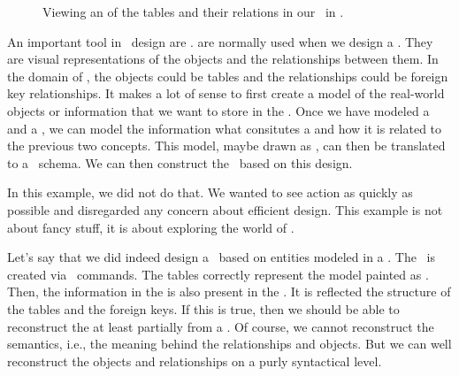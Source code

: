%
%
\FloatBarrier%
%
\begin{figure}%
\centering%
%
%
%
\floatSep%
%
%
%
\floatRowSep%
%
%
%
%
\caption{Viewing an  of the tables and their relations in our \db\ in \libreofficeBase.}%
\label{fig:factoryLibreOfficeBaseERD}%
%
\end{figure}%
%
An important tool in \db\ design are .
 are normally used when we design a \db.
They are visual representations of the objects and the relationships between them.
In the domain of , the objects could be tables and the relationships could be foreign key relationships.
It makes a lot of sense to first create a model of the real-world objects or information that we want to store in the \db.
Once we have modeled a  and a , we can model the information what consitutes a  and how it is related to the previous two concepts.
This model, maybe drawn as , can then be translated to a \db\ schema.
We can then construct the \db\ based on this design.

In this example, we did not do that.
We wanted to see action as quickly as possible and disregarded any concern about efficient design.
This example is not about fancy stuff, it is about exploring the world of .

Let's say that we did indeed design a \db\ based on entities modeled in a .
The \db\ is created via \sql\ commands.
The tables correctly represent the model painted as .
Then, the information in the  is also present in the \db.
It is reflected the structure of the tables and the foreign keys.
If this is true, then we should be able to reconstruct the  at least partially from a \db.
Of course, we cannot reconstruct the semantics, i.e., the meaning behind the relationships and objects.
But we can well reconstruct the objects and relationships on a purly syntactical level.

